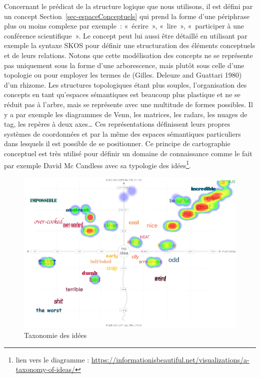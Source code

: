 \documentclass[
  letterpaper,
  DIV=11,
  numbers=noendperiod]{scrreprt}
\begin{document}
Concernant le prédicat de la structure logique que nous utilisons, il
est défini par un concept Section~\ref{sec-espaceConceptuels} qui prend
la forme d'une périphrase plus ou moins complexe par exemple~:
«~écrire~», «~lire~», «~participer à une conférence scientifique~». Le
concept peut lui aussi être détaillé en utilisant par exemple la syntaxe
SKOS pour définir une structuration des éléments conceptuels et de leurs
relations. Notons que cette modélisation des concepts ne se représente
pas uniquement sous la forme d'une arborescence, mais plutôt sous celle
d'une topologie ou pour employer les termes de (Gilles. Deleuze and
Guattari 1980) d'un rhizome. Les structures topologiques étant plus
souples, l'organisation des concepts en tant qu'espaces sémantiques est
beaucoup plus plastique et ne se réduit pas à l'arbre, mais se
représente avec une multitude de formes possibles. Il y a par exemple
les diagrammes de Venn, les matrices, les radars, les nuages de tag, les
repères à deux axes\ldots{} Ces représentations définissent leurs
propres systèmes de coordonnées et par la même des espaces sémantiques
particuliers dans lesquels il est possible de se positionner. Ce
principe de cartographie conceptuel est très utilisé pour définir un
domaine de connaissance comme le fait par exemple David Mc Candless avec
sa typologie des idées\footnote{lien vers le diagramme :
  \url{https://informationisbeautiful.net/visualizations/a-taxonomy-of-ideas/}}.

\begin{figure}

{\centering \includegraphics{images/TaxonomyIdeas.png}

}

\caption{\label{fig-TaxonomyIdeas}Taxonomie des idées}

\end{figure}
\end{document}
